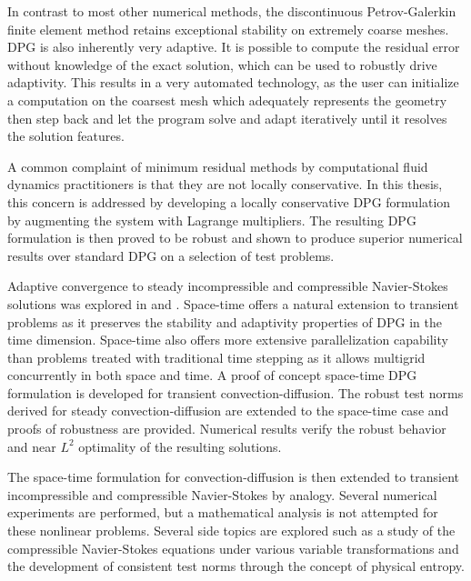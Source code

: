 \documentclass[12pt]{report} %
\begin{document}
In contrast to most other numerical methods, the discontinuous Petrov-Galerkin finite element method retains exceptional stability on extremely coarse meshes.
DPG is also inherently very adaptive.
It is possible to compute the residual error without knowledge of the exact solution, which can be used to robustly drive adaptivity.
This results in a very automated technology, as the user can initialize a computation on the coarsest mesh which adequately represents the geometry 
then step back and let the program solve and adapt iteratively until it resolves the solution features.

A common complaint of minimum residual methods by computational fluid dynamics practitioners is that they are not locally conservative.
In this thesis, this concern is addressed by developing a locally conservative DPG formulation by augmenting the system with Lagrange multipliers.
The resulting DPG formulation is then proved to be robust and shown to produce superior numerical results over standard DPG
on a selection of test problems.

Adaptive convergence to steady incompressible and compressible Navier-Stokes solutions 
was explored in \cite{JesseDissertation} and \cite{NateDissertation}.
Space-time offers a natural extension to transient problems as it preserves the stability and adaptivity properties of DPG
in the time dimension.
Space-time also offers more extensive parallelization capability than problems treated with traditional time stepping
as it allows multigrid concurrently in both space and time.
A proof of concept space-time DPG formulation is developed for transient convection-diffusion. 
The robust test norms derived for steady convection-diffusion are extended to the space-time case and proofs of robustness are provided.
Numerical results verify the robust behavior and near $L^2$ optimality of the resulting solutions.

The space-time formulation for convection-diffusion is then extended to transient incompressible and compressible Navier-Stokes by analogy.
Several numerical experiments are performed, but a mathematical analysis is not attempted for these nonlinear problems.
Several side topics are explored such as a study of the compressible Navier-Stokes equations under various variable transformations
and the development of consistent test norms through the concept of physical entropy.
\end{document}

